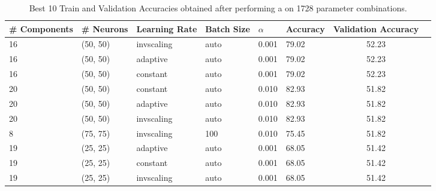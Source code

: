 \def\arraystretch{1.25}
\begin{table}[H]
\centering
{\small
\begin{tabular}{l l l l l l c c}
\hline
\hline
\textbf{\# Components} & \textbf{\# Neurons} & \textbf{Learning Rate} & \textbf{Batch Size} & \textbf{$\alpha$} & \textbf{Accuracy} & \textbf{Validation Accuracy} \\
\hline
\hline
16 & (50, 50) & invscaling & auto & 0.001 & 79.02 & 52.23 \\
16 & (50, 50) & adaptive & auto & 0.001 & 79.02 & 52.23 \\
16 & (50, 50) & constant & auto & 0.001 & 79.02 & 52.23 \\
20 & (50, 50) & constant & auto & 0.010 & 82.93 & 51.82 \\
20 & (50, 50) & adaptive & auto & 0.010 & 82.93 & 51.82 \\
20 & (50, 50) & invscaling & auto & 0.010 & 82.93 & 51.82 \\
8 & (75, 75) & invscaling & 100 & 0.010 & 75.45 & 51.82 \\
19 & (25, 25) & adaptive & auto & 0.001 & 68.05 & 51.42 \\
19 & (25, 25) & constant & auto & 0.001 & 68.05 & 51.42 \\
19 & (25, 25) & invscaling & auto & 0.001 & 68.05 & 51.42 \\
\hline
\end{tabular}
\caption{Best 10 Train and Validation Accuracies obtained after performing a  on 1728 parameter combinations.}
}
\end{table}